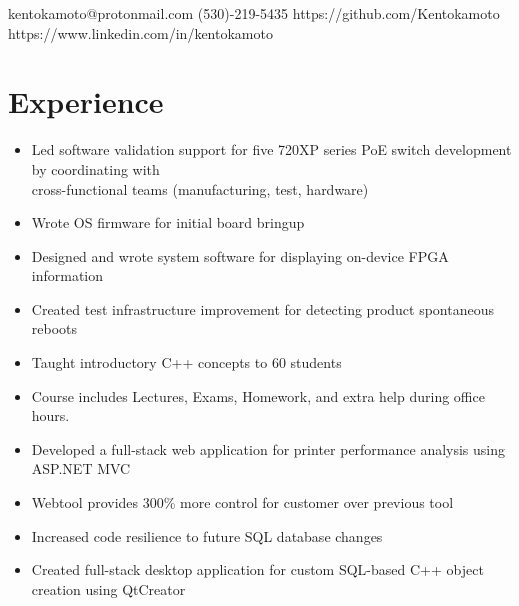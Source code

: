 \documentclass{Custom_CV}
\begin{document}
{kentokamoto@protonmail.com}
{}
{}
{(530)-219-5435}
{https://github.com/Kentokamoto}
{https://www.linkedin.com/in/kentokamoto}

\hfill %
\section{Experience}
\begin{itemize}[noitemsep]
    \item Led software validation support for five 720XP series PoE switch development by coordinating with\\ cross-functional teams (manufacturing, test, hardware)
    \item Wrote OS firmware for initial board bringup
    \item Designed and wrote system software for displaying on-device FPGA information
    \item Created test infrastructure improvement for detecting product spontaneous reboots
\end{itemize}

\begin{itemize}[noitemsep]
    \item Taught introductory C++ concepts to 60 students
    \item Course includes Lectures, Exams, Homework, and extra help during office hours.
\end{itemize}
\begin{itemize}[rightmargin=\dimexpr\linewidth-15cm-\leftmargin\relax,noitemsep]
    \item Developed a full-stack web application for printer performance analysis using ASP.NET MVC
    \item Webtool provides 300\% more control for customer over previous tool
    \item Increased code resilience to future SQL database changes
\end{itemize}
\begin{itemize}[rightmargin=\dimexpr\linewidth-15cm-\leftmargin\relax,noitemsep]
\item Created full-stack desktop application for custom SQL-based C++ object creation using QtCreator
\end{itemize}
\end{document}
